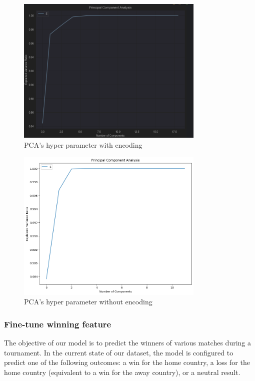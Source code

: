 \documentclass[a4paper,12pt]{article}
\begin{document}
\begin{figure}
  \centering
  \includegraphics[width=0.8\textwidth]{./images/PCA_analyze}
  \caption{PCA's hyper parameter with encoding}
  \label{fig:PCA_encode}
\end{figure}

\begin{figure}
  \centering
  \includegraphics[width=0.8\textwidth]{./images/PCA_analyze_without_encoding.png}
  \caption{PCA's hyper parameter without encoding}
  \label{fig:PCA_without_encode}
\end{figure}

\subsubsection{Fine-tune winning feature}

The objective of our model is to predict the winners of various matches during a tournament. In the current state of our dataset, the model is configured to predict one of the following outcomes: a win for the home country, a loss for the home country (equivalent to a win for the away country), or a neutral result.\\
\end{document}
